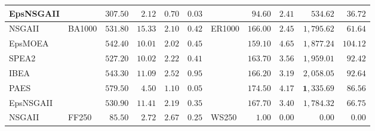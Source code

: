 \begin{table}[b]
{\begin{tabular}{
        |l||
        l|
        r
        r|
        r
        r
        ||l|
        r
        r|
        r
        r|
      }
      EpsNSGAII  &                           & $307.50$                         & $2.12$                           & $0.70$          & $0.03$                           &                                 & $94.60$           & $2.41$          & $534.62$            & $36.72$          \\
      \hline
      NSGAII     & \multirow{6}{*}{ BA1000 } & $531.80$                         & $15.33$                          & $2.10$          & $0.42$                           & \multirow{6}{*}{ ER1000 }       & $166.00$          & $2.45$          & $1,795.62$          & $61.64$          \\
      EpsMOEA    &                           & $542.40$                         & $10.01$                          & $2.02$          & $0.45$                           &                                 & $159.10$          & $4.65$          & $1,877.24$          & $104.12$         \\
      SPEA2      &                           & $527.20$                         & $10.02$                          & $2.22$          & $0.41$                           &                                 & $163.70$          & $3.56$          & $1,959.01$          & $92.42$          \\
      IBEA       &                           & $543.30$                         & $11.09$                          & $2.52$          & $0.95$                           &                                 & $166.20$          & $3.19$          & $2,058.05$          & $92.64$          \\
      PAES       &                           & $\mathbf{579.50}$                & $\mathbf{4.50}$                  & $\mathbf{1.10}$ & $0.05$                           &                                 & $\mathbf{174.50}$ & $\mathbf{4.17}$ & $\mathbf{1,335.69}$ & $\mathbf{86.56}$ \\
      EpsNSGAII  &                           & $530.90$                         & $11.41$                          & $2.19$          & $0.35$                           &                                 & $167.70$          & $3.40$          & $1,784.32$          & $66.75$          \\
      \hline
      NSGAII     & \multirow{6}{*}{ FF250 }  & $85.50$                          & $2.72$                           & $2.67$          & $0.25$                           & \multirow{6}{*}{ WS250 }        & $1.00$            & $0.00$          & $0.00$              & $0.00$           \\

\end{tabular}}
\end{table}
